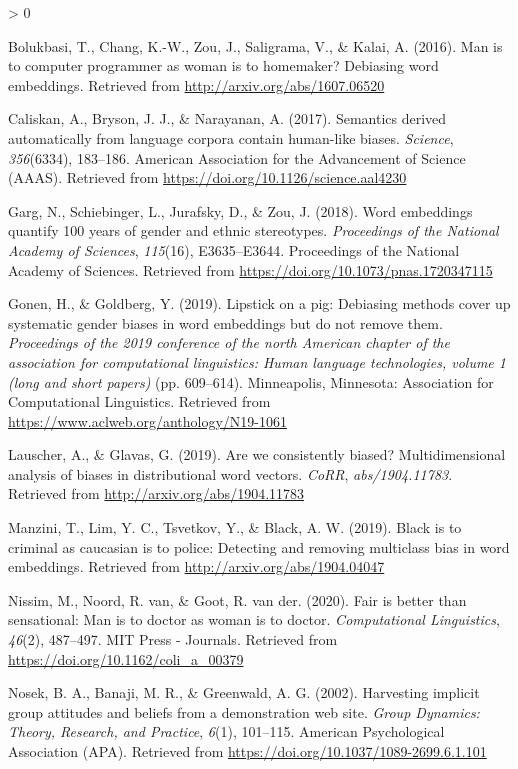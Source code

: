 \documentclass[
  10pt,
  dvipsnames,enabledeprecatedfontcommands]{scrartcl}
\newlength{\cslhangindent}
\newenvironment{CSLReferences}[2] %
 {%
  \setlength{\parindent}{0pt}
  \ifodd #1 \everypar{\setlength{\hangindent}{\cslhangindent}}\ignorespaces\fi
  \ifnum #2 > 0
  \setlength{\parskip}{#2\baselineskip}
  \fi
 }%
 {}
\begin{document}
\hypertarget{refs}{}
\begin{CSLReferences}{1}{0}
\leavevmode\hypertarget{ref-bolukbasi2016man}{}%
Bolukbasi, T., Chang, K.-W., Zou, J., Saligrama, V., \& Kalai, A.
(2016). Man is to computer programmer as woman is to homemaker?
Debiasing word embeddings. Retrieved from
\url{http://arxiv.org/abs/1607.06520}

\leavevmode\hypertarget{ref-Caliskan2017semanticsBiases}{}%
Caliskan, A., Bryson, J. J., \& Narayanan, A. (2017). Semantics derived
automatically from language corpora contain human-like biases.
\emph{Science}, \emph{356}(6334), 183--186. American Association for the
Advancement of Science ({AAAS}). Retrieved from
\url{https://doi.org/10.1126/science.aal4230}

\leavevmode\hypertarget{ref-Garg2018years}{}%
Garg, N., Schiebinger, L., Jurafsky, D., \& Zou, J. (2018). Word
embeddings quantify 100 years of gender and ethnic stereotypes.
\emph{Proceedings of the National Academy of Sciences}, \emph{115}(16),
E3635--E3644. Proceedings of the National Academy of Sciences. Retrieved
from \url{https://doi.org/10.1073/pnas.1720347115}

\leavevmode\hypertarget{ref-Gonen2019lipstick}{}%
Gonen, H., \& Goldberg, Y. (2019). Lipstick on a pig: {D}ebiasing
methods cover up systematic gender biases in word embeddings but do not
remove them. \emph{Proceedings of the 2019 conference of the north
{A}merican chapter of the association for computational linguistics:
Human language technologies, volume 1 (long and short papers)} (pp.
609--614). Minneapolis, Minnesota: Association for Computational
Linguistics. Retrieved from
\url{https://www.aclweb.org/anthology/N19-1061}

\leavevmode\hypertarget{ref-Lauscher2019multidimensional}{}%
Lauscher, A., \& Glavas, G. (2019). Are we consistently biased?
Multidimensional analysis of biases in distributional word vectors.
\emph{CoRR}, \emph{abs/1904.11783}. Retrieved from
\url{http://arxiv.org/abs/1904.11783}

\leavevmode\hypertarget{ref-Manzini2019blackToCriminal}{}%
Manzini, T., Lim, Y. C., Tsvetkov, Y., \& Black, A. W. (2019). Black is
to criminal as caucasian is to police: Detecting and removing multiclass
bias in word embeddings. Retrieved from
\url{http://arxiv.org/abs/1904.04047}

\leavevmode\hypertarget{ref-Nissim2020fair}{}%
Nissim, M., Noord, R. van, \& Goot, R. van der. (2020). Fair is better
than sensational: Man is to doctor as woman is to doctor.
\emph{Computational Linguistics}, \emph{46}(2), 487--497. {MIT} Press -
Journals. Retrieved from \url{https://doi.org/10.1162/coli_a_00379}

\leavevmode\hypertarget{ref-Nosek2002harvesting}{}%
Nosek, B. A., Banaji, M. R., \& Greenwald, A. G. (2002). Harvesting
implicit group attitudes and beliefs from a demonstration web site.
\emph{Group Dynamics: Theory, Research, and Practice}, \emph{6}(1),
101--115. American Psychological Association ({APA}). Retrieved from
\url{https://doi.org/10.1037/1089-2699.6.1.101}

\end{CSLReferences}
\end{document}
